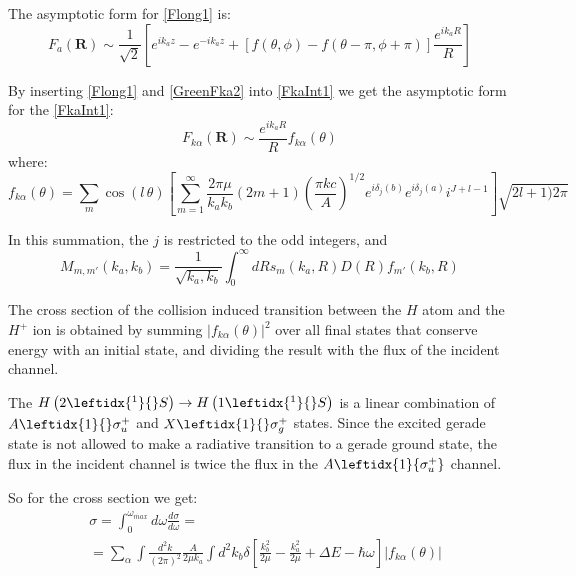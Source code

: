 The asymptotic form for \eqref{Flong1} is:
\begin{equation}\label{FlongA}
F_a(\mathbf{R}) \sim \frac{1}{\sqrt{2}}\left[e^{ik_az}-e^{-ik_az} + [f(\theta,\phi) - f(\theta-\pi,\phi+\pi)]\frac{e^{ik_aR}}{R}\right]
\end{equation}

By inserting \eqref{Flong1} and \eqref{GreenFka2} into \eqref{FkaInt1} we get the asymptotic form for the  \eqref{FkaInt1}:
\begin{equation}\label{FlongAA1}
F_{k\alpha}(\mathbf{R}) \sim \frac{e^{ik_aR}}{R}f_{k\alpha}(\theta)
\end{equation}
where:
\begin{equation}\label{fkaa1}
f_{k\alpha}(\theta) = \sum_{m}{\cos(l\,\theta)\left[\sum_{m=1}^{\infty}{\frac{2\pi\mu}{k_ak_b}(2m+1)\left(\frac{\pi k c}{A}\right)^{1/2}e^{i\delta_j(b)}e^{i\delta_j(a)}i^{J+l-1} }\right]\sqrt{2l+1)2\pi}}
\end{equation}

In this summation, the $ j $ is restricted to the odd integers, and 
\begin{equation}\label{Mll1}
M_{m,m'}(k_a,k_b) = \frac{1}{\sqrt{k_a,k_b}}\int_0^{\infty}{dRs_m(k_a,R)D(R)f_{m'}(k_b,R)} 
\end{equation}

The cross section of the collision induced transition between the $ H $ atom and the $ H^{+} $ ion is obtained by summing $ \left|f_{k\alpha}(\theta)\right|^2 $ over all final states that conserve energy with an initial state, and dividing the result with the flux of the incident channel.

The $ H\left(2 \leftidx{^1}{}S\right) \rightarrow H\left(1 \leftidx{^1}{}S\right) $ is a linear combination of $ A \leftidx{1}{}\sigma_u^{+} $ and $ X \leftidx{1}{}\sigma_g^{+} $ states. Since the excited gerade state is not allowed to make a radiative transition to a gerade ground state, the flux in the incident channel is twice the flux in the $ A \leftidx{1}{\sigma_u^{+}} $ channel.

So for the cross section we get:
\begin{equation}\label{crs1}
\begin{split}
& \sigma = \int_0^{\omega_{max}}{d\omega\frac{d\sigma}{d\omega}} = \\[.8em]
& = \sum_{\alpha}{\int{\frac{d^2k}{(2\pi)^2}\frac{A}{2\mu k_a}\int{d^2k_b\delta\left[\frac{k_b^2}{2\mu} - \frac{k_a^2}{2\mu} + \Delta E - \hbar\omega \right]\left|f_{k\alpha}(\theta) \right| } } }
\end{split}
\end{equation}



